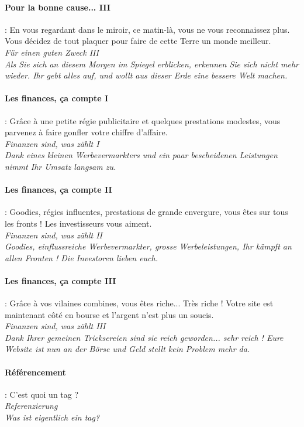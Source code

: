 \documentclass[10pt,a4paper]{article}
\begin{document}
\paragraph{Pour la bonne cause... III} : En vous regardant dans le miroir, ce matin-là, vous ne vous reconnaissez plus. Vous décidez de tout plaquer pour faire de cette Terre un monde meilleur.\\
\textit{Für einen guten Zweck III}\\
\textit{Als Sie sich an diesem Morgen im Spiegel erblicken, erkennen Sie sich nicht mehr wieder. Ihr gebt alles auf, und wollt aus dieser Erde eine bessere Welt machen.}


\paragraph{Les finances, ça compte I} : Grâce à une petite régie publicitaire et quelques prestations modestes, vous parvenez à faire gonfler votre chiffre d'affaire.\\
\textit{Finanzen sind, was zählt I}\\
\textit{Dank eines kleinen Werbevermarkters und ein paar bescheidenen Leistungen nimmt Ihr Umsatz langsam zu.}


\paragraph{Les finances, ça compte II} : Goodies, régies influentes, prestations de grande envergure, vous êtes sur tous les fronts ! Les investisseurs vous aiment.\\
\textit{Finanzen sind, was zählt II}\\
\textit{Goodies, einflussreiche Werbevermarkter, grosse Werbeleistungen, Ihr kämpft an allen Fronten ! Die Investoren lieben euch.}


\paragraph{Les finances, ça compte III} : Grâce à vos vilaines combines, vous êtes riche... Très riche ! Votre site est maintenant côté en bourse et l'argent n'est plus un soucis.\\
\textit{Finanzen sind, was zählt III}\\
\textit{Dank Ihrer gemeinen Tricksereien sind sie reich geworden... sehr reich ! Eure Website ist nun an der Börse und Geld stellt kein Problem mehr da.}


\paragraph{Référencement }: C'est quoi un tag ?\\
\textit{Referenzierung}\\
\textit{Was ist eigentlich ein tag?}
\end{document}
